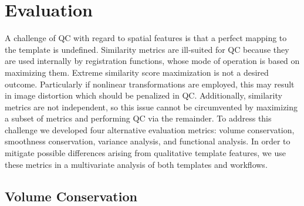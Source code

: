 \section{Evaluation}

A challenge of QC with regard to spatial features is that a perfect mapping to the template is undefined.
Similarity metrics are ill-suited for QC because they are used internally by registration functions, whose mode of operation is based on maximizing them.
Extreme similarity score maximization is not a desired outcome.
Particularly if nonlinear transformations are employed, this may result in image distortion which should be penalized in QC.
Additionally, similarity metrics are not independent, so this issue cannot be circumvented by maximizing a subset of metrics and performing QC via the remainder.
To address this challenge we developed four alternative evaluation metrics: volume conservation, smoothness conservation, variance analysis, and functional analysis.
In order to mitigate possible differences arising from qualitative template features, we use these metrics in a multivariate analysis of both templates and workflows.


\subsection{Volume Conservation}

\begin{sansmath}
\end{sansmath}


